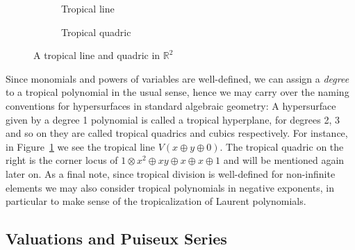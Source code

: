 \documentclass[
  paper=a4,
  titlepage,
  bibliography=totoc,
  pagesize=pdftex
]{scrartcl}
\numberwithin{figure}{section}
\numberwithin{equation}{section}
\numberwithin{table}{section}
\newcommand*\setR{\mathds{R}}
\theoremstyle{definition}
\numberwithin{definition}{section}
\begin{document}
\begin{figure}[tbh]
  \centering
  \begin{subfigure}{0.49\textwidth}
    \centering
    \caption{Tropical line}
    \label{fig:trop:line}
  \end{subfigure}
  \begin{subfigure}{0.49\textwidth}
    \centering
    \caption{Tropical quadric}
    \label{fig:trop:quad}
  \end{subfigure}
  \caption{A tropical line and quadric in $\setR^2$}
  \label{fig:tropLineQuad}
\end{figure}

Since monomials and powers of variables are well-defined, we can assign a \emph{degree} to
a tropical polynomial in the usual sense, hence we may carry over the naming conventions
for hypersurfaces in standard algebraic geometry: A hypersurface given by a degree 1
polynomial is called a tropical hyperplane, for degrees 2, 3 and so on they are called
tropical quadrics and cubics respectively. For instance, in Figure~\ref{fig:trop:line} we
see the tropical line $V(x \oplus y \oplus 0)$. The tropical quadric on the right is the
corner locus of $1\otimes x^2 \oplus xy \oplus x \oplus x \oplus 1$ and will be mentioned
again later on. As a final note, since tropical division is well-defined for non-infinite
elements we may also consider tropical polynomials in negative exponents, in particular to
make sense of the tropicalization of Laurent polynomials.

\subsection{Valuations and Puiseux Series}
\end{document}
